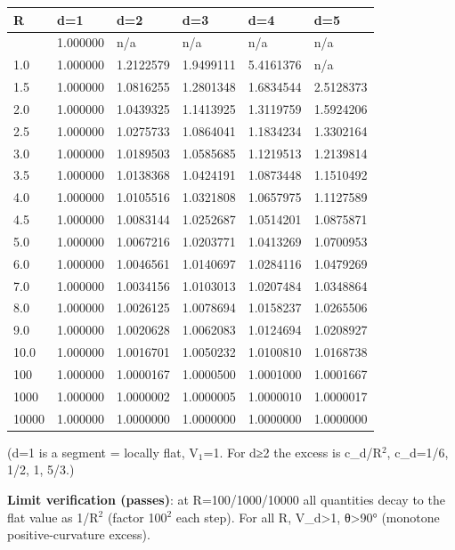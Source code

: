 \documentclass[
]{ltjsarticle}
\newcounter{none} %
\begin{document}
{\def\LTcaptype{none} %
\begin{longtable}[]{@{}llllll@{}}
\toprule\noalign{}
R & d=1 & d=2 & d=3 & d=4 & d=5 \\
\midrule\noalign{}
\endhead
\bottomrule\noalign{}
\endlastfoot
0.5 & 1.000000 & n/a & n/a & n/a & n/a \\
1.0 & 1.000000 & 1.2122579 & 1.9499111 & 5.4161376 & n/a \\
1.5 & 1.000000 & 1.0816255 & 1.2801348 & 1.6834544 & 2.5128373 \\
2.0 & 1.000000 & 1.0439325 & 1.1413925 & 1.3119759 & 1.5924206 \\
2.5 & 1.000000 & 1.0275733 & 1.0864041 & 1.1834234 & 1.3302164 \\
3.0 & 1.000000 & 1.0189503 & 1.0585685 & 1.1219513 & 1.2139814 \\
3.5 & 1.000000 & 1.0138368 & 1.0424191 & 1.0873448 & 1.1510492 \\
4.0 & 1.000000 & 1.0105516 & 1.0321808 & 1.0657975 & 1.1127589 \\
4.5 & 1.000000 & 1.0083144 & 1.0252687 & 1.0514201 & 1.0875871 \\
5.0 & 1.000000 & 1.0067216 & 1.0203771 & 1.0413269 & 1.0700953 \\
6.0 & 1.000000 & 1.0046561 & 1.0140697 & 1.0284116 & 1.0479269 \\
7.0 & 1.000000 & 1.0034156 & 1.0103013 & 1.0207484 & 1.0348864 \\
8.0 & 1.000000 & 1.0026125 & 1.0078694 & 1.0158237 & 1.0265506 \\
9.0 & 1.000000 & 1.0020628 & 1.0062083 & 1.0124694 & 1.0208927 \\
10.0 & 1.000000 & 1.0016701 & 1.0050232 & 1.0100810 & 1.0168738 \\
100 & 1.000000 & 1.0000167 & 1.0000500 & 1.0001000 & 1.0001667 \\
1000 & 1.000000 & 1.0000002 & 1.0000005 & 1.0000010 & 1.0000017 \\
10000 & 1.000000 & 1.0000000 & 1.0000000 & 1.0000000 & 1.0000000 \\
\end{longtable}
}

(d=1 is a segment = locally flat, V\(_{1}\)=1. For d≥2 the excess is
c\_d/R\(^{2}\), c\_d=1/6, 1/2, 1, 5/3.)

\textbf{Limit verification (passes)}: at R=100/1000/10000 all quantities
decay to the flat value as 1/R\(^{2}\) (factor 100\(^{2}\) each step).
For all R, V\_d\textgreater1, θ\textgreater90° (monotone
positive-curvature excess).
\end{document}
